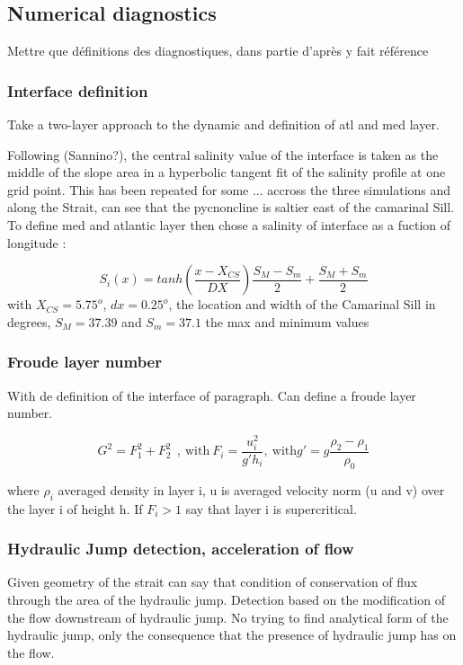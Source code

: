 \subsection{Numerical diagnostics}
Mettre que définitions des diagnostiques, dans partie d'après y fait référence

\subsubsection{Interface definition}

Take a two-layer approach to the dynamic and definition of atl and med layer.

Following (Sannino?), the central salinity value of the interface is taken as the middle of the slope area in a hyperbolic tangent fit of the salinity profile at one grid point. This has been repeated for some ... accross the three simulations and along the Strait, can see that the pycnoncline is saltier east of the camarinal Sill. To define med and atlantic layer then chose a salinity of interface as a fuction of longitude :

\begin{equation}
	S_i(x)=tanh(\frac{x-X_{CS}}{DX})\frac{S_M-S_m}{2}+\frac{S_M+S_m}{2}
\end{equation}
with $X_{CS}=5.75^o$, $dx=0.25^o$, the location and width of the Camarinal Sill in degrees, $S_M=37.39$ and $S_m=37.1$ the max and minimum values


\subsubsection{Froude layer number}

With de definition of the interface of paragraph. Can define a froude layer number. 

\begin{equation}
G^2=F_1^2+F_2^2 \ \ , \ \text{with} \ F_i=\frac{u_i^2}{g'h_i} , \ \text{with} g'=g \frac{\rho_2-\rho_1}{\rho_0}
\end{equation}

where $\rho_i$ averaged density in layer i,  u is averaged velocity norm (u and v) over the layer i of height h. If $F_i>1$ say that layer i is supercritical.


\subsubsection{Hydraulic Jump detection, acceleration of flow}
Given geometry of the strait can say that condition of conservation of flux through the area of the hydraulic jump. 
Detection based on the modification of the flow downstream of hydraulic jump. No trying to find analytical form of the hydraulic jump, only the consequence that the presence of hydraulic jump has on the flow.


